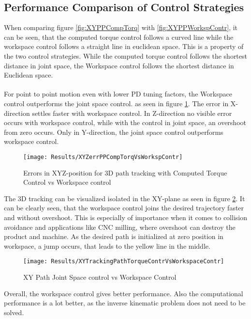 \subsection{Performance Comparison of Control Strategies}
When comparing figure \ref{fig:XYPPCompTorq} with \ref{fig:XYPPWorkspContr}, it can be seen, that the computed torque control follows a curved line while the workspace control follows a straight line in euclidean space. This is a property of the two control strategies. While the computed torque control follows the shortest distance in joint space, the Workspace control follows the shortest distance in Euclidean space.\\
\\
For point to point motion even with lower PD tuning factors, the Workspace control outperforms the joint space control. as seen in figure \ref{fig:XYZerrPPCompTorqVsWorkspContr}. The error in X-direction settles faster with workspace control. In Z-direction no visible error occurs with workspace control, while with the control in joint space, an overshoot from zero occurs. Only in Y-direction, the joint space control outperforms workspace control.
\begin{figure}[H]
	\texttt{[image: Results/XYZerrPPCompTorqVsWorkspContr]}
	\caption{Errors in XYZ-position for 3D path tracking with Computed Torque Control vs Workspace control}
	\label{fig:XYZerrPPCompTorqVsWorkspContr}
\end{figure}

The 3D tracking can be visualized isolated in the XY-plane as seen in figure \ref{fig:XYTrackingPathTorqueContrVsWorkspaceContr}. It can be clearly seen, that the workspace control joins the desired trajectory faster and without overshoot. This is especially of importance when it comes to collision avoidance and applications like \ac{CNC} milling, where overshoot can destroy the product and machine. As the desired path is initialized at zero position in workspace, a jump occurs, that leads to the yellow line in the middle.

\begin{figure}[H]
	\texttt{[image: Results/XYTrackingPathTorqueContrVsWorkspaceContr]}
	\caption{XY Path Joint Space control vs Workspace Control}
	\label{fig:XYTrackingPathTorqueContrVsWorkspaceContr}
\end{figure}



Overall, the workspace control gives better performance. Also the computational performance is a lot better, as the inverse kinematic problem does not need to be solved.

